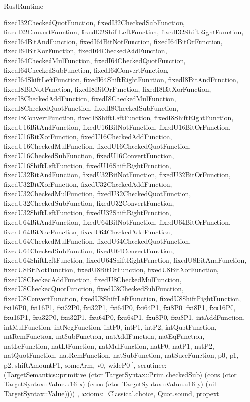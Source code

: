 \begin{lexlean}{RustRuntime}
\begin{semanticmodule}
{{      fixedI32CheckedQuotFunction,
      fixedI32CheckedSubFunction,
      fixedI32ConvertFunction,
      fixedI32ShiftLeftFunction,
      fixedI32ShiftRightFunction,
      fixedI64BitAndFunction,
      fixedI64BitNotFunction,
      fixedI64BitOrFunction,
      fixedI64BitXorFunction,
      fixedI64CheckedAddFunction,
      fixedI64CheckedMulFunction,
      fixedI64CheckedQuotFunction,
      fixedI64CheckedSubFunction,
      fixedI64ConvertFunction,
      fixedI64ShiftLeftFunction,
      fixedI64ShiftRightFunction,
      fixedI8BitAndFunction,
      fixedI8BitNotFunction,
      fixedI8BitOrFunction,
      fixedI8BitXorFunction,
      fixedI8CheckedAddFunction,
      fixedI8CheckedMulFunction,
      fixedI8CheckedQuotFunction,
      fixedI8CheckedSubFunction,
      fixedI8ConvertFunction,
      fixedI8ShiftLeftFunction,
      fixedI8ShiftRightFunction,
      fixedU16BitAndFunction,
      fixedU16BitNotFunction,
      fixedU16BitOrFunction,
      fixedU16BitXorFunction,
      fixedU16CheckedAddFunction,
      fixedU16CheckedMulFunction,
      fixedU16CheckedQuotFunction,
      fixedU16CheckedSubFunction,
      fixedU16ConvertFunction,
      fixedU16ShiftLeftFunction,
      fixedU16ShiftRightFunction,
      fixedU32BitAndFunction,
      fixedU32BitNotFunction,
      fixedU32BitOrFunction,
      fixedU32BitXorFunction,
      fixedU32CheckedAddFunction,
      fixedU32CheckedMulFunction,
      fixedU32CheckedQuotFunction,
      fixedU32CheckedSubFunction,
      fixedU32ConvertFunction,
      fixedU32ShiftLeftFunction,
      fixedU32ShiftRightFunction,
      fixedU64BitAndFunction,
      fixedU64BitNotFunction,
      fixedU64BitOrFunction,
      fixedU64BitXorFunction,
      fixedU64CheckedAddFunction,
      fixedU64CheckedMulFunction,
      fixedU64CheckedQuotFunction,
      fixedU64CheckedSubFunction,
      fixedU64ConvertFunction,
      fixedU64ShiftLeftFunction,
      fixedU64ShiftRightFunction,
      fixedU8BitAndFunction,
      fixedU8BitNotFunction,
      fixedU8BitOrFunction,
      fixedU8BitXorFunction,
      fixedU8CheckedAddFunction,
      fixedU8CheckedMulFunction,
      fixedU8CheckedQuotFunction,
      fixedU8CheckedSubFunction,
      fixedU8ConvertFunction,
      fixedU8ShiftLeftFunction,
      fixedU8ShiftRightFunction,
      fxi16P0,
      fxi16P1,
      fxi32P0,
      fxi32P1,
      fxi64P0,
      fxi64P1,
      fxi8P0,
      fxi8P1,
      fxu16P0,
      fxu16P1,
      fxu32P0,
      fxu32P1,
      fxu64P0,
      fxu64P1,
      fxu8P0,
      fxu8P1,
      intAddFunction,
      intMulFunction,
      intNegFunction,
      intP0,
      intP1,
      intP2,
      intQuotFunction,
      intRemFunction,
      intSubFunction,
      natAddFunction,
      natEqFunction,
      natLeFunction,
      natLtFunction,
      natMulFunction,
      natP0,
      natP1,
      natP2,
      natQuotFunction,
      natRemFunction,
      natSubFunction,
      natSuccFunction,
      p0,
      p1,
      p2,
      shiftAmountP1,
      someArm,
      v0,
      wideP0
    ],
    scrutinee: (TargetSemantics::primitive (ctor TargetSyntax::Prim.checkedSub) (cons (ctor TargetSyntax::Value.u16 x) (cons (ctor TargetSyntax::Value.u16 y) (nil TargetSyntax::Value))))
  },
  axioms: [Classical.choice, Quot.sound, propext]
}


\end{semanticmodule}
\end{lexlean}
